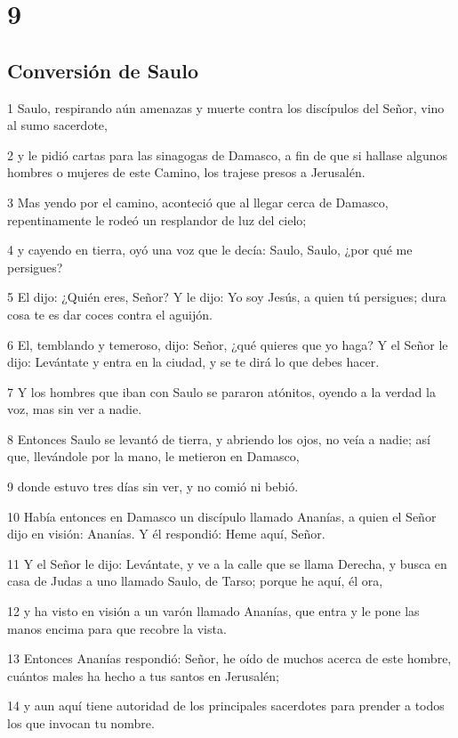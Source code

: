 \chapter{9}

\section*{Conversión de Saulo}

\par 1 Saulo, respirando aún amenazas y muerte contra los discípulos del Señor, vino al sumo sacerdote,
\par 2 y le pidió cartas para las sinagogas de Damasco, a fin de que si hallase algunos hombres o mujeres de este Camino, los trajese presos a Jerusalén.
\par 3 Mas yendo por el camino, aconteció que al llegar cerca de Damasco, repentinamente le rodeó un resplandor de luz del cielo;
\par 4 y cayendo en tierra, oyó una voz que le decía: Saulo, Saulo, ¿por qué me persigues?
\par 5 El dijo: ¿Quién eres, Señor? Y le dijo: Yo soy Jesús, a quien tú persigues; dura cosa te es dar coces contra el aguijón.
\par 6 El, temblando y temeroso, dijo: Señor, ¿qué quieres que yo haga? Y el Señor le dijo: Levántate y entra en la ciudad, y se te dirá lo que debes hacer.
\par 7 Y los hombres que iban con Saulo se pararon atónitos, oyendo a la verdad la voz, mas sin ver a nadie.
\par 8 Entonces Saulo se levantó de tierra, y abriendo los ojos, no veía a nadie; así que, llevándole por la mano, le metieron en Damasco,
\par 9 donde estuvo tres días sin ver, y no comió ni bebió.
\par 10 Había entonces en Damasco un discípulo llamado Ananías, a quien el Señor dijo en visión: Ananías. Y él respondió: Heme aquí, Señor.
\par 11 Y el Señor le dijo: Levántate, y ve a la calle que se llama Derecha, y busca en casa de Judas a uno llamado Saulo, de Tarso; porque he aquí, él ora,
\par 12 y ha visto en visión a un varón llamado Ananías, que entra y le pone las manos encima para que recobre la vista.
\par 13 Entonces Ananías respondió: Señor, he oído de muchos acerca de este hombre, cuántos males ha hecho a tus santos en Jerusalén;
\par 14 y aun aquí tiene autoridad de los principales sacerdotes para prender a todos los que invocan tu nombre.
